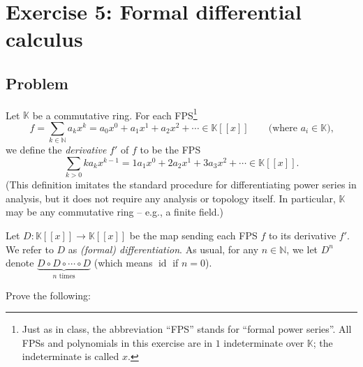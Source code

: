 \documentclass[paper=a4, fontsize=12pt]{scrartcl} %
\newcommand{\NN}{\mathbb{N}} %
\newcommand{\KK}{\mathbb{K}} %
\newcommand{\id}{\operatorname{id}} %
\newcommand{\ivee}[1]{\left[ \left[ #1 \right] \right]}
\let\sumnonlimits\sum
\renewcommand{\sum}{\sumnonlimits\limits}
\theoremstyle{plainsl}
\theoremstyle{definition}
\theoremstyle{remark}
\begin{document}
\section{Exercise 5: Formal differential calculus}

\subsection{Problem}

Let $\KK$ be a commutative ring.
For each FPS\footnote{Just as in class, the abbreviation ``FPS''
stands for ``formal power series''.
All FPSs and polynomials in this exercise are in $1$ indeterminate
over $\KK$; the indeterminate is called $x$.}
\[
f = \sum_{k \in \NN} a_k x^k = a_0 x^0 + a_1 x^1 + a_2 x^2 + \cdots \in \KK\ivee{x}
\qquad
\text{(where $a_i \in \KK$),}
\]
we define the \textit{derivative} $f'$ of $f$ to be the FPS
\[
\sum_{k > 0} k a_k x^{k-1}
= 1 a_1 x^0 + 2 a_2 x^1 + 3 a_3 x^2 + \cdots \in \KK\ivee{x} .
\]
(This definition imitates the standard procedure for differentiating
power series in analysis, but it does not require any analysis or
topology itself. In particular, $\KK$ may be any commutative ring
-- e.g., a finite field.)

Let $D : \KK\ivee{x} \to \KK\ivee{x}$ be the map sending
each FPS $f$ to its derivative $f'$.
We refer to $D$ as \textit{(formal) differentiation}.
As usual, for any $n \in \NN$, we let $D^n$ denote
$\underbrace{D \circ D \circ \cdots \circ D}_{n \text{ times}}$
(which means $\id$ if $n = 0$).

Prove the following:
\end{document}
